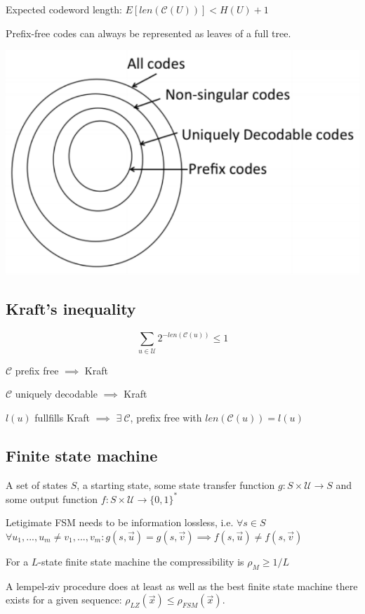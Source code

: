 \documentclass[10pt,a4paper,landscape]{article}
\newcommand{\code}{\mathcal{C}}
\newcommand{\alphabet}{\mathcal{U}}
\begin{document}
\begin{multicols*}{4}
Expected codeword length: $E[len(\code(U))] < H(U) + 1$

Prefix-free codes can always be represented as leaves of a full tree.

\begin{colfig}
	\centering
	\includegraphics[width=\linewidth]{code-classes.png}
\end{colfig}

\subsection{Kraft's inequality}
$$\sum_{u \in \alphabet} 2^{-len(\code(u))} \leq 1$$

$\code$ prefix free $\implies$ Kraft

$\code$ uniquely decodable $\implies$ Kraft

$l(u)$ fullfills Kraft $\implies$ $\exists \ \code$, prefix free with $len(\code(u)) = l(u)$

\subsection{Finite state machine}
A set of states $S$, a starting state, some state transfer function $g: S \times \alphabet \rightarrow S$ and some output function $f: S \times \alphabet \rightarrow \{0,1\}^*$

Letigimate FSM needs to be information lossless, i.e. $\forall s \in S$ $\forall u_1, ..., u_m \neq v_1, ..., v_m: g(s, \vec u) = g(s, \vec v) \implies f(s, \vec u) \neq f(s, \vec v)$

For a $L$-state finite state machine the compressibility is $\rho_M \geq 1/L$

A lempel-ziv procedure does at least as well as the best finite state machine there exists for a given sequence: $\rho_{LZ}(\vec x) \leq \rho_{FSM}(\vec x)$.


\end{multicols*}
\end{document}
